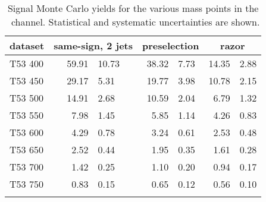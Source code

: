         \begin{table}[pbt]
            \centering
            \begin{tabular}{l *3{r@{$\pm$}l}}
                
\toprule
dataset & \multicolumn{2}{c}{same-sign, 2 jets}& \multicolumn{2}{c}{preselection}& \multicolumn{2}{c}{razor} \\
\midrule
T53 400& 59.91 & 10.73& 38.32 & 7.73& 14.35 & 2.88\\
T53 450& 29.17 & 5.31& 19.77 & 3.98& 10.78 & 2.15\\
T53 500& 14.91 & 2.68& 10.59 & 2.04& 6.79 & 1.32\\
T53 550& 7.98 & 1.45& 5.85 & 1.14& 4.26 & 0.83\\
T53 600& 4.29 & 0.78& 3.24 & 0.61& 2.53 & 0.48\\
T53 650& 2.52 & 0.44& 1.95 & 0.35& 1.61 & 0.28\\
T53 700& 1.42 & 0.25& 1.10 & 0.20& 0.94 & 0.17\\
T53 750& 0.83 & 0.15& 0.65 & 0.12& 0.56 & 0.10\\
 \\
\bottomrule

            \end{tabular}
            \caption{Signal Monte Carlo yields for the various mass points
            in the \M\M\ channel. Statistical and systematic uncertainties are shown.}
            \label{tab:signal_yields_mumu}
        \end{table}

